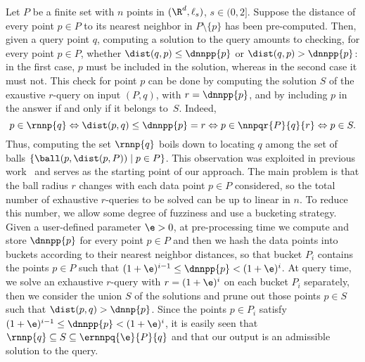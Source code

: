 Let $P$ be a finite set with $n$ points in $(\R^d,\ell_s)$, $s\in
(0,2]$.  Suppose the distance of every point $p\in P$ to its nearest
  neighbor in $P\setminus\{p\}$ has been pre-computed. Then, given a query point
  $q$, computing a solution to the \rnn query amounts to
  checking, for every point $p\in P$, whether $\dist(q,p)\leq
  \dnnpp{p}$ or $\dist(q,p)>\dnnpp{p}$: in the first case, $p$ must be
  included in the solution, whereas in the second case it must
  not. This check for point $p$ can be done by computing the solution
  $S$ of the exaustive $r$-\pleb query on input $(P,q)$, with
  $r=\dnnpp{p}$, and by including $p$ in the answer if and only if it
  belongs to~$S$. Indeed, 
\[
p\in \rnnp{q} \Leftrightarrow \dist(p,q)\leq \dnnpp{p} = r
\Leftrightarrow p\in \nnpqr{P}{q}{r} \Leftrightarrow p\in S.
\] 
Thus, computing the set $\rnnp{q}$ boils down to locating $q$ among
the set of balls $\{\ball(p, \dist(p,P)) \mid p\in P\}$.  This
observation was exploited in previous work~\cite{KM00} and serves as
the starting point of our approach.  The main problem is that the ball
radius $r$ changes with each data point $p\in P$ considered, so the
total number of exhaustive $r$-\pleb queries to be solved can be up to
linear in $n$. To reduce this number, we allow some degree of
fuzziness and use a bucketing strategy. Given a user-defined parameter
$\e>0$, at pre-processing time we compute and store $\dnnpp{p}$ for
every point $p\in P$ and then we hash the data points into buckets
according to their nearest neighbor distances, so that bucket $P_i$
contains the points $p\in P$ such that
$(1+\e)^{i-1} \leq \dnnpp{p} < (1+\e)^i$. At query time, we
  solve an exhaustive $r$-\pleb query with $r=(1+\e)^{i}$ on each
  bucket $P_i$ separately, then we consider the union $S$ of the
  solutions and prune out those points $p\in S$ such that
  $\dist(p,q)>\dnnp{p}$. Since the points $p\in P_i$ satisfy
  $(1+\e)^{i-1}\leq \dnnpp{p} < (1+\e)^{i}$, it is easily seen that
  $\rnnp{q}\subseteq S\subseteq \ernnpq{\e}{P}{q}$ and that our output
  is an admissible solution to the \rnn query.

